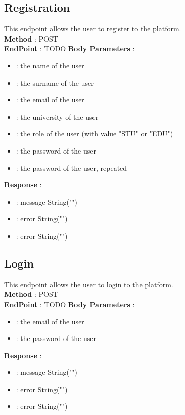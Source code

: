 \subsection*{Registration}
This endpoint allows the user to register to the platform.\\
\textbf{Method} : POST \\
\textbf{EndPoint} : {\color{blue} TODO}
\textbf{Body Parameters} :
\begin{itemize}
    \item {} : the name of the user
    \item {} : the surname of the user
    \item {} : the email of the user
    \item {} : the university of the user
    \item {} : the role of the user (with value "STU" or "EDU")
    \item {} : the password of the user
    \item {} : the password of the user, repeated
\end{itemize}
\textbf{Response} :
\begin{itemize}
    \item {} : message String("")
    \item {} : error String("")
    \item {} : error String("")
\end{itemize}

\subsection*{Login}
This endpoint allows the user to login to the platform.\\
\textbf{Method} : POST \\
\textbf{EndPoint} : {\color{blue} TODO}
\textbf{Body Parameters} :
\begin{itemize}
    \item {} : the email of the user
    \item {} : the password of the user
\end{itemize}
\textbf{Response} :
\begin{itemize}
    \item {} : message String("")
    \item {} : error String("")
    \item {} : error String("")
\end{itemize}

